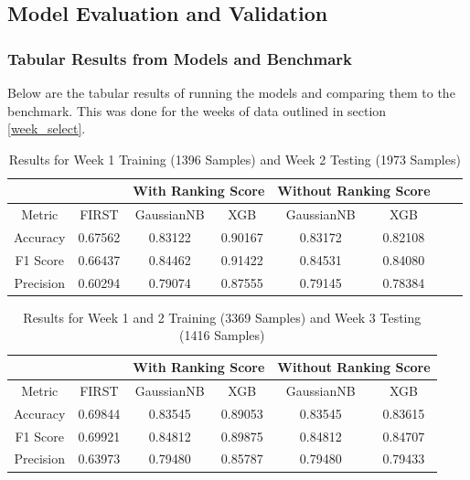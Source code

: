 \documentclass{article}
\begin{document}
\subsection{Model Evaluation and Validation}

\subsubsection{Tabular Results from Models and Benchmark} \label{tabular_results}
\par
Below are the tabular results of running the models and comparing them to the benchmark. This was done for the weeks of data outlined in section \ref{week_select}.

\begin{table}[H]
    \caption{Results for Week 1 Training (1396 Samples) and Week 2 Testing (1973 Samples)}
    \centering
    \begin{tabular} { |c|c|c|c|c|c|c|c| }
    \hline
    \multicolumn{2}{|c|}{} & \multicolumn{2}{|c|}{With Ranking Score} & \multicolumn{2}{|c|}{Without Ranking Score} \\
    \hline
    Metric & FIRST & GaussianNB & XGB & GaussianNB & XGB \\
    \hline
    Accuracy & 0.67562 & 0.83122 & 0.90167 & 0.83172 & 0.82108 \\
    \hline
    F1 Score & 0.66437 & 0.84462 & 0.91422 & 0.84531 & 0.84080 \\
    \hline
    Precision & 0.60294 & 0.79074 & 0.87555 & 0.79145 & 0.78384 \\
    \hline
    \end{tabular}
    \label{table:results_week_1}
\end{table}

\begin{table}[H]
    \caption{Results for Week 1 and 2 Training (3369 Samples) and Week 3 Testing (1416 Samples)}
    \centering
    \begin{tabular} { |c|c|c|c|c|c| }
    \hline
    \multicolumn{2}{|c|}{} & \multicolumn{2}{|c|}{With Ranking Score} & \multicolumn{2}{|c|}{Without Ranking Score} \\
    \hline
    Metric & FIRST & GaussianNB & XGB & GaussianNB & XGB \\
    \hline
    Accuracy & 0.69844 & 0.83545 & 0.89053 & 0.83545 & 0.83615 \\
    \hline
    F1 Score & 0.69921 & 0.84812 & 0.89875 & 0.84812 & 0.84707 \\
    \hline
    Precision & 0.63973 & 0.79480 & 0.85787 & 0.79480 & 0.79433 \\
    \hline
    \end{tabular}
    \label{table:results_week_2}
\end{table}
\end{document}
